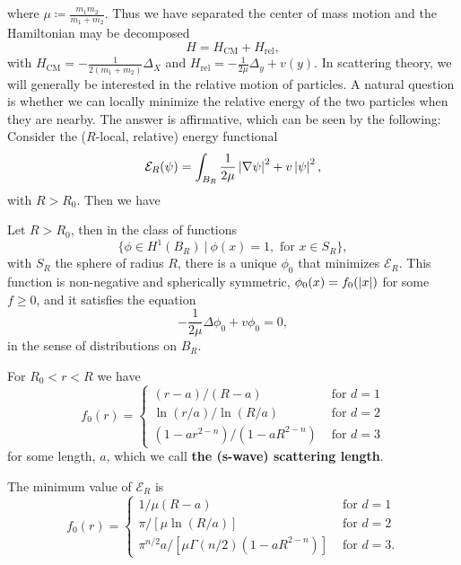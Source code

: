 where $ \mu\coloneqq \frac{m_1m_2}{m_1+m_2} $. Thus we have separated the center of mass motion and the Hamiltonian may be decomposed \begin{equation}
H=H_{\text{CM}}+H_{\text{rel}},
\end{equation}
with $ H_{\text{CM}}=-\frac{1}{2(m_1+m_2)}\Delta_X $ and $ H_{\text{rel}}=-\frac{1}{2\mu}\Delta_y+v(y) $. In scattering theory, we will generally be interested in the relative motion of particles. A natural question is whether we can locally minimize the relative energy of the two particles when they are nearby. The answer is affirmative, which can be seen by the following:\\
Consider the ($ R $-local, relative) energy functional \begin{equation}
\mathcal{E}_R(\psi)=\int_{B_R} \frac{1}{2\mu}\left\lvert \nabla\psi \right\rvert^2+v\left\lvert \psi \right\rvert^2,
\end{equation}
with $ R>R_0 $. Then we have 
\begin{theorem}\label{TheoremScatteringLength}
	Let $ R>R_0 $, then in the class of functions 
	$$ \{\phi\in H^1(B_R)\ \vert\ \phi(x)=1,\text{ for }x\in S_R\}, $$ with $ S_R $ the sphere of radius $ R $,
	there is a unique $ \phi_0 $ that minimizes $ \mathcal{E}_R $. This function is non-negative and spherically symmetric, $ \phi_0(x)=f_0(\left\lvert x \right\rvert) $ for some $ f\geq 0 $, and it satisfies the equation\begin{equation}
	-\frac{1}{2\mu}\Delta\phi_0+v\phi_0=0,
	\end{equation}
	in the sense of distributions on $ B_R $.
	
	For $ R_0<r<R $ we have \begin{equation}
	f_0(r)=\begin{cases}
	(r-a)/(R-a)&\text{ for }d=1\\
	\ln(r/a)/\ln(R/a)& \text{ for }d=2\\
	(1-ar^{2-n})/(1-aR^{2-n})& \text{ for }d=3
	\end{cases}
	\end{equation}
	for some length, $ a $, which we call \textbf{the (s-wave) scattering length}.
	
	The minimum value of $ \mathcal{E}_R $ is 
	\begin{equation}
	f_0(r)=\begin{cases}
	1/\mu(R-a)&\text{ for }d=1\\
	\pi/[\mu\ln(R/a)]& \text{ for }d=2\\
	\pi^{n/2}a/[\mu\Gamma(n/2)(1-aR^{2-n})]& \text{ for }d=3.
	\end{cases}
	\end{equation}
\end{theorem}
